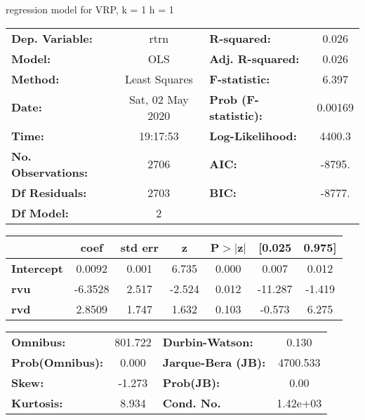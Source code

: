 regression model for VRP, k = 1 h = 1\begin{center}
\begin{tabular}{lclc}
\toprule
\textbf{Dep. Variable:}    &       rtrn       & \textbf{  R-squared:         } &     0.026   \\
\textbf{Model:}            &       OLS        & \textbf{  Adj. R-squared:    } &     0.026   \\
\textbf{Method:}           &  Least Squares   & \textbf{  F-statistic:       } &     6.397   \\
\textbf{Date:}             & Sat, 02 May 2020 & \textbf{  Prob (F-statistic):} &  0.00169    \\
\textbf{Time:}             &     19:17:53     & \textbf{  Log-Likelihood:    } &    4400.3   \\
\textbf{No. Observations:} &        2706      & \textbf{  AIC:               } &    -8795.   \\
\textbf{Df Residuals:}     &        2703      & \textbf{  BIC:               } &    -8777.   \\
\textbf{Df Model:}         &           2      & \textbf{                     } &             \\
\bottomrule
\end{tabular}
\begin{tabular}{lcccccc}
                   & \textbf{coef} & \textbf{std err} & \textbf{z} & \textbf{P$> |$z$|$} & \textbf{[0.025} & \textbf{0.975]}  \\
\midrule
\textbf{Intercept} &       0.0092  &        0.001     &     6.735  &         0.000        &        0.007    &        0.012     \\
\textbf{rvu}       &      -6.3528  &        2.517     &    -2.524  &         0.012        &      -11.287    &       -1.419     \\
\textbf{rvd}       &       2.8509  &        1.747     &     1.632  &         0.103        &       -0.573    &        6.275     \\
\bottomrule
\end{tabular}
\begin{tabular}{lclc}
\textbf{Omnibus:}       & 801.722 & \textbf{  Durbin-Watson:     } &    0.130  \\
\textbf{Prob(Omnibus):} &   0.000 & \textbf{  Jarque-Bera (JB):  } & 4700.533  \\
\textbf{Skew:}          &  -1.273 & \textbf{  Prob(JB):          } &     0.00  \\
\textbf{Kurtosis:}      &   8.934 & \textbf{  Cond. No.          } & 1.42e+03  \\
\bottomrule
\end{tabular}
\end{center}

